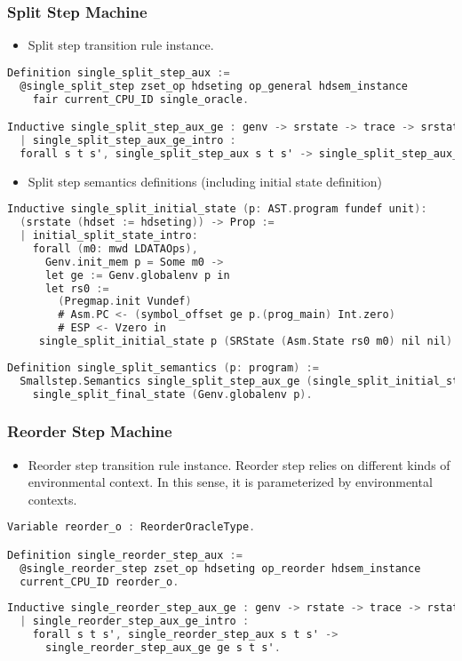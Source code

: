\subsubsection{Split Step Machine}
\begin{itemize}[leftmargin=*]
\item Split step transition rule instance.
\end{itemize}
\begin{lstlisting}[language=C]
Definition single_split_step_aux :=
  @single_split_step zset_op hdseting op_general hdsem_instance 
    fair current_CPU_ID single_oracle.

Inductive single_split_step_aux_ge : genv -> srstate -> trace -> srstate -> Prop :=
  | single_split_step_aux_ge_intro : 
  forall s t s', single_split_step_aux s t s' -> single_split_step_aux_ge ge s t s'.
\end{lstlisting}


\begin{itemize}[leftmargin=*]
\item Split step semantics definitions (including initial state definition)
\end{itemize}
\begin{lstlisting}[language=C]
Inductive single_split_initial_state (p: AST.program fundef unit): 
  (srstate (hdset := hdseting)) -> Prop :=
  | initial_split_state_intro: 
    forall (m0: mwd LDATAOps),
      Genv.init_mem p = Some m0 ->
      let ge := Genv.globalenv p in
      let rs0 :=
        (Pregmap.init Vundef)
        # Asm.PC <- (symbol_offset ge p.(prog_main) Int.zero)
        # ESP <- Vzero in
     single_split_initial_state p (SRState (Asm.State rs0 m0) nil nil).
          
Definition single_split_semantics (p: program) :=
  Smallstep.Semantics single_split_step_aux_ge (single_split_initial_state p) 
    single_split_final_state (Genv.globalenv p).
\end{lstlisting}

\subsubsection{Reorder Step Machine}
\begin{itemize}[leftmargin=*]
\item Reorder step transition rule instance. Reorder step relies on different kinds of environmental context. In this sense, 
it is parameterized by environmental contexts.
\end{itemize}
\begin{lstlisting}[language=C]
Variable reorder_o : ReorderOracleType.

Definition single_reorder_step_aux :=
  @single_reorder_step zset_op hdseting op_reorder hdsem_instance 
  current_CPU_ID reorder_o.
  
Inductive single_reorder_step_aux_ge : genv -> rstate -> trace -> rstate -> Prop :=
  | single_reorder_step_aux_ge_intro : 
    forall s t s', single_reorder_step_aux s t s' -> 
      single_reorder_step_aux_ge ge s t s'.  
\end{lstlisting}


